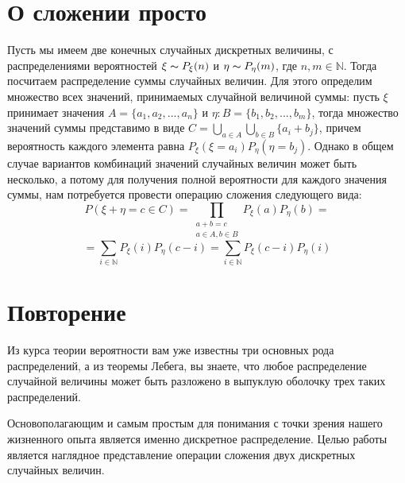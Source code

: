 \documentclass{article}
\begin{document}
    \section{О сложении просто}
    Пусть мы имеем две конечных случайных дискретных величины, с распределениями вероятностей $\xi \thicksim P_\xi(n)$ и $\eta \thicksim P_\eta(m)$, где $n, m \in \mathds{N}$. Тогда посчитаем распределение суммы случайных величин. Для этого определим множество всех значений, принимаемых случайной величиной суммы: пусть $\xi$ принимает значения $A = \{a_1, a_2, ..., a_n\}$ и $\eta: B = \{b_1, b_2, ..., b_m\}$, тогда множество значений суммы представимо в виде $C = \bigcup\limits_{a\in A}\bigcup\limits_{b\in B}{\{a_i + b_j\}}$, причем вероятность каждого элемента равна $P_\xi(\xi = a_i)P_\eta(\eta = b_j)$. Однако в общем случае вариантов комбинаций значений случайных величин может быть несколько, а потому для получения полной вероятности для каждого значения суммы, нам потребуется провести операцию сложения следующего вида:
        $$P(\xi + \eta = c \in C) = \prod_{\substack{a + b = c \\ {a \in A, b \in B}}}{P_\xi(a)P_\eta(b)}=$$
        $$= \sum\limits_{i \in \mathds{N}}{P_\xi(i)P_\eta(c - i)} = 
        \sum\limits_{i \in \mathds{N}}{P_\xi(c - i)P_\eta(i)}$$

    \section{Повторение}
        Из курса теории вероятности вам уже известны три основных рода распределений, а из теоремы Лебега, вы знаете, что любое распределение случайной величины может быть разложено в выпуклую оболочку трех таких распределений. 

        Основополагающим и самым простым для понимания с точки зрения нашего жизненного опыта является именно дискретное распределение. Целью работы является наглядное представление операции сложения двух дискретных случайных величин.
        
\end{document}
